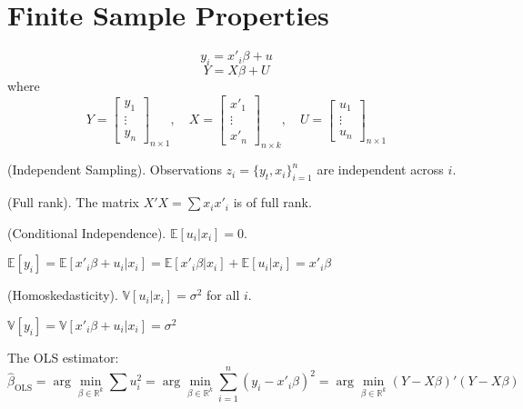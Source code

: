 \section{Finite Sample Properties}

\[ y_i = x'_i \beta + u \]
\[ Y = X \beta + U \]
where
\begin{equation*}
  Y = \begin{bmatrix}
    y_1\\
    \vdots\\
    y_n
  \end{bmatrix}_{n \times 1}, \quad
  X = \begin{bmatrix}
    x'_1\\
    \vdots\\
    x'_n
  \end{bmatrix}_{n \times k}, \quad
  U = \begin{bmatrix}
    u_1\\
    \vdots\\
    u_n
  \end{bmatrix}_{n \times 1}
\end{equation*}

\begin{assumption}\label{Assumption 1}
  (Independent Sampling). Observations $z_i = \{ y_t, x_i \}_{i = 1}^n$ are independent across $i$.
\end{assumption}

\begin{assumption}\label{Assumption 2}
  (Full rank). The matrix $X'X = \sum x_i x'_i$ is of full rank.
\end{assumption}

\begin{assumption}\label{Assumption 3}
  (Conditional Independence). $\mathbb{E}[u_i | x_i] = 0$.

  $\mathbb{E}[y_i] = \mathbb{E}[x'_i \beta + u_i | x_i] = \mathbb{E}[x'_i \beta | x_i] + \mathbb{E}[u_i | x_i] = x'_i \beta$
\end{assumption}

\begin{assumption}\label{Assumption 4}  
  (Homoskedasticity). $\mathbb{V}[u_i | x_i] = \sigma^2$ for all $i$.

  $\mathbb{V}[y_i] = \mathbb{V}[x'_i \beta + u_i | x_i] = \sigma^2$
\end{assumption}

The OLS estimator:
\[ \hat{\beta}_{\text{OLS}} = \arg\min_{\beta \in \mathbb{R}^k} 
   \sum u_i^2 = \arg\min_{\beta \in \mathbb{R}^k} \sum_{i = 1}^n
   (y_i - x'_i \beta)^2 = \arg\min_{\beta \in \mathbb{R}^k} (Y - X
   \beta)'(Y - X \beta) \]
   
